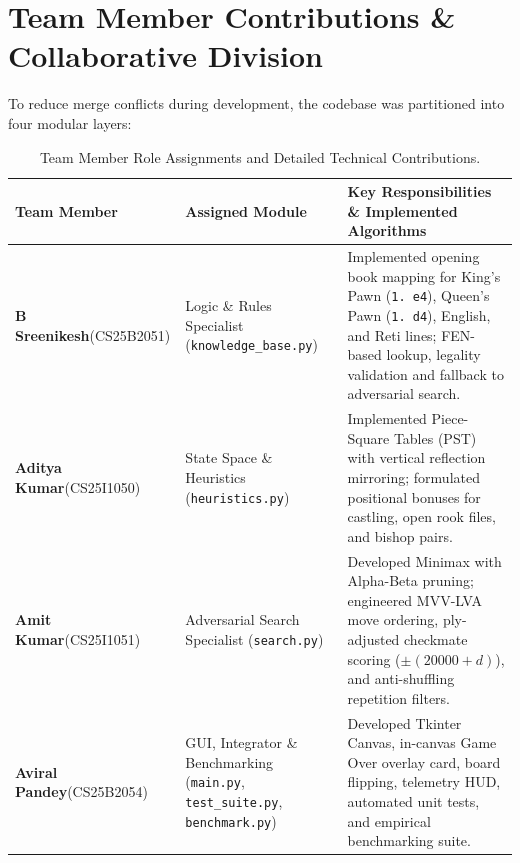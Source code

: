 \documentclass[11pt,a4paper]{article}
\begin{document}
\section{Team Member Contributions \& Collaborative Division}
To reduce merge conflicts during development, the codebase was partitioned into four modular layers:
\begin{table}[H]
\centering
\caption{Team Member Role Assignments and Detailed Technical Contributions.}
\label{tab:team_division}
\small
\renewcommand{\arraystretch}{1.25}
\begin{tabularx}{\textwidth}{@{} L{3.0cm} L{3.6cm} Y @{}}
\toprule
\textbf{Team Member} & \textbf{Assigned Module} & \textbf{Key Responsibilities \& Implemented Algorithms} \\
\midrule
\textbf{B Sreenikesh}\newline(CS25B2051) & Logic \& Rules Specialist (\texttt{knowledge\_base.py}) & Implemented opening book mapping for King's Pawn (\texttt{1. e4}), Queen's Pawn (\texttt{1. d4}), English, and Reti lines; FEN-based lookup, legality validation and fallback to adversarial search. \\
\addlinespace
\textbf{Aditya Kumar}\newline(CS25I1050) & State Space \& Heuristics (\texttt{heuristics.py}) & Implemented Piece-Square Tables (PST) with vertical reflection mirroring; formulated positional bonuses for castling, open rook files, and bishop pairs. \\
\addlinespace
\textbf{Amit Kumar}\newline(CS25I1051) & Adversarial Search Specialist (\texttt{search.py}) & Developed Minimax with Alpha-Beta pruning; engineered MVV-LVA move ordering, ply-adjusted checkmate scoring ($\pm(20000+d)$), and anti-shuffling repetition filters. \\
\addlinespace
\textbf{Aviral Pandey}\newline(CS25B2054) & GUI, Integrator \& Benchmarking (\texttt{main.py}, \texttt{test\_suite.py}, \texttt{benchmark.py}) & Developed Tkinter Canvas, in-canvas Game Over overlay card, board flipping, telemetry HUD, automated unit tests, and empirical benchmarking suite. \\
\bottomrule
\end{tabularx}
\end{table}
\end{document}
